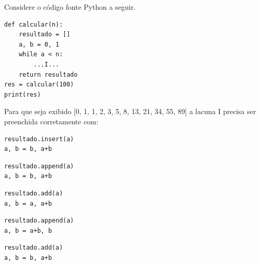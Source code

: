 

{%

\item \rtask \ponto{\pt} 
Considere o código fonte Python a seguir.

\begin{lstlisting}[style=Python]
def calcular(n):
    resultado = []
    a, b = 0, 1
    while a < n:
        ...I... 
    return resultado
res = calcular(100)
print(res)
\end{lstlisting}

Para que seja exibido [0, 1, 1, 2, 3, 5, 8, 13, 21, 34, 55, 89] a lacuna I precisa ser preenchida corretamente com:

\begin{answerlist}[label={\texttt{\Alph*}.},leftmargin=*]
\ti \begin{lstlisting}[style=Python,numbers=none]
resultado.insert(a)
a, b = b, a+b
\end{lstlisting}

\di \begin{lstlisting}[style=Python,numbers=none]
resultado.append(a)
a, b = b, a+b
\end{lstlisting}

\ti \begin{lstlisting}[style=Python,numbers=none]
resultado.add(a)
a, b = a, a+b
\end{lstlisting}

\ti \begin{lstlisting}[style=Python,numbers=none]
resultado.append(a)
a, b = a+b, b
\end{lstlisting}

\ti \begin{lstlisting}[style=Python,numbers=none]
resultado.add(a)
a, b = b, a+b
\end{lstlisting}

\end{answerlist}


}
